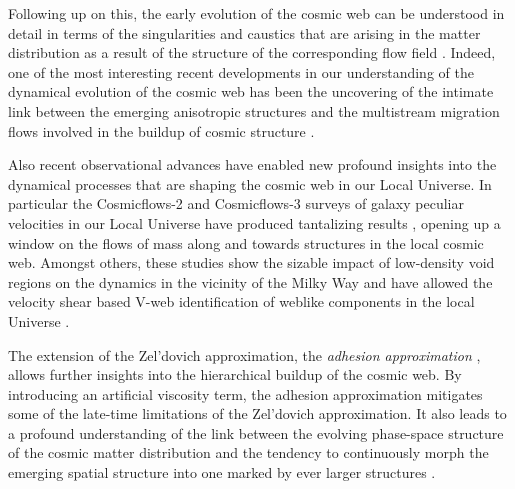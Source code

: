 Following up on this, the early evolution of the cosmic web can be understood in detail in terms of the singularities and caustics that 
are arising in the matter distribution as a result of the structure of the corresponding flow field \citep[see][]{Shandarin1989,Hidding2014}. 
Indeed, one of the most interesting recent developments in our understanding of the dynamical evolution of the cosmic web has been the 
uncovering of the intimate link between the emerging anisotropic structures and the multistream migration flows involved in the buildup of 
cosmic structure \citep[][]{Shandarin2011,Shandarin2012,Falck2012,Abel2012}. 

Also recent observational advances have enabled new 
profound insights into the dynamical processes that are shaping the cosmic web in our Local Universe. In particular the Cosmicflows-2 and 
Cosmicflows-3 surveys of galaxy peculiar velocities in our Local Universe have produced tantalizing results \citep{Courtois2013,Tully2014}, opening up a window on the flows of mass along and towards structures in the local cosmic web. Amongst others, these studies show 
the sizable impact of low-density void regions on the dynamics in the vicinity of the Milky Way and have allowed 
the velocity shear based V-web identification of weblike components in the local Universe \citep{Hoffman2017}. 

The extension of the Zel'dovich approximation, the \emph{adhesion approximation} \citep{Gurbatov1989, Gurbatov2012, Kofman1992, Hidding2012}, allows further insights into the hierarchical buildup 
of the cosmic web. By introducing an artificial viscosity term, the adhesion 
approximation mitigates some of the late-time limitations of the Zel'dovich approximation. It also leads to a profound understanding 
of the link between the evolving phase-space structure of the cosmic matter distribution and the tendency to continuously morph the 
emerging spatial structure into one marked by ever larger structures \citep[see also][for a review of analytical extensions to the Zel'dovich approximation]{1995PhR...262....1S}. 

